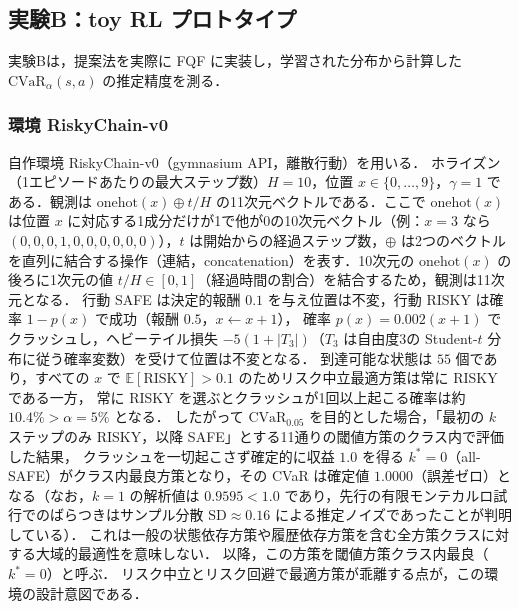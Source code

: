 \documentclass[a4paper,10pt]{jsarticle}
\theoremstyle{definition}
\newcommand{\CVaR}{\mathrm{CVaR}}
\newcommand{\E}{\mathbb{E}}
\begin{document}
\subsection{実験B：toy RL プロトタイプ}
\label{subsec:expB}
実験Bは，提案法を実際に FQF に実装し，学習された分布から計算した $\CVaR_\alpha(s,a)$ の推定精度を測る．

\subsubsection{環境 RiskyChain-v0}
自作環境 RiskyChain-v0（gymnasium API，離散行動）を用いる．
ホライズン（1エピソードあたりの最大ステップ数）$H=10$，位置 $x\in\{0,\dots,9\}$，$\gamma=1$ である．観測は $\mathrm{onehot}(x)\oplus t/H$ の11次元ベクトルである．ここで $\mathrm{onehot}(x)$ は位置 $x$ に対応する1成分だけが1で他が0の10次元ベクトル（例：$x=3$ なら $(0,0,0,1,0,0,0,0,0,0)$），$t$ は開始からの経過ステップ数，$\oplus$ は2つのベクトルを直列に結合する操作（連結，concatenation）を表す．10次元の $\mathrm{onehot}(x)$ の後ろに1次元の値 $t/H\in[0,1]$（経過時間の割合）を結合するため，観測は11次元となる．
行動 SAFE は決定的報酬 $0.1$ を与え位置は不変，行動 RISKY は確率 $1-p(x)$ で成功（報酬 $0.5$，$x\leftarrow x+1$），
確率 $p(x)=0.002(x+1)$ でクラッシュし，ヘビーテイル損失 $-5(1+|T_3|)$（$T_3$ は自由度3の Student-$t$ 分布に従う確率変数）を受けて位置は不変となる．
到達可能な状態は $55$ 個であり，すべての $x$ で $\E[\mathrm{RISKY}]>0.1$ のためリスク中立最適方策は常に RISKY である一方，
常に RISKY を選ぶとクラッシュが1回以上起こる確率は約 $10.4\%>\alpha=5\%$ となる．
したがって $\CVaR_{0.05}$ を目的とした場合，「最初の $k$ ステップのみ RISKY，以降 SAFE」とする11通りの閾値方策のクラス内で評価した結果，
クラッシュを一切起こさず確定的に収益 $1.0$ を得る $k^*=0$（all-SAFE）がクラス内最良方策となり，その CVaR は確定値 $1.0000$（誤差ゼロ）となる（なお，$k=1$ の解析値は $0.9595<1.0$ であり，先行の有限モンテカルロ試行でのばらつきはサンプル分散 $\mathrm{SD}\approx0.16$ による推定ノイズであったことが判明している）．
これは一般の状態依存方策や履歴依存方策を含む全方策クラスに対する大域的最適性を意味しない．
以降，この方策を閾値方策クラス内最良（$k^*=0$）と呼ぶ．
リスク中立とリスク回避で最適方策が乖離する点が，この環境の設計意図である．
\end{document}
